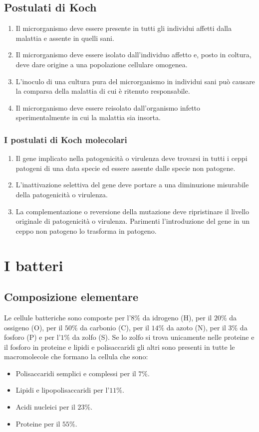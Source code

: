 \subsection{Postulati di Koch}
\begin{enumerate}
\item Il microrganismo deve essere presente in tutti gli individui affetti dalla malattia e assente in quelli sani.
\item Il microrganismo deve essere isolato dall'individuo affetto e, posto in coltura, deve dare origine a una popolazione cellulare omogenea.
\item L'inoculo di una cultura pura del microrganismo in individui sani pu\`o causare la comparsa della malattia di cui \`e ritenuto responsabile. 
\item Il microrganismo deve essere reisolato dall'organismo infetto sperimentalmente in cui la malattia sia insorta.
\end{enumerate}
\subsubsection{I postulati di Koch molecolari}
\begin{enumerate}
\item Il gene implicato nella patogenicit\`a o virulenza deve trovarsi in tutti i ceppi patogeni di una data specie ed essere assente dalle specie non 
patogene.
\item L'inattivazione selettiva del gene deve portare a una diminuzione misurabile della patogenicit\`a o virulenza.
\item La complementazione o reversione della mutazione deve ripristinare il livello originale di patogenicit\`a o virulenza. Parimenti l'introduzione del
gene in un ceppo non patogeno lo trasforma in patogeno.
\end{enumerate}
\section{I batteri}
\subsection{Composizione elementare}
Le cellule batteriche sono composte per l'$8\%$ da idrogeno (H), per il $20\%$ da ossigeno (O), per il $50\%$ da carbonio (C), per il $14\%$ da azoto (N), 
per il $3\%$ da fosforo (P) e per l'$1\%$ da zolfo (S). Se lo zolfo si trova unicamente nelle proteine e il fosforo in proteine e lipidi e polisaccaridi gli
altri sono presenti in tutte le macromolecole che formano la cellula che sono:
\begin{itemize}
\item Polisaccaridi semplici e complessi per il $7\%$.
\item Lipidi e lipopolisaccaridi per l'$11\%$. 
\item Acidi nucleici per il $23\%$.
\item Proteine per il $55\%$.
\end{itemize}
